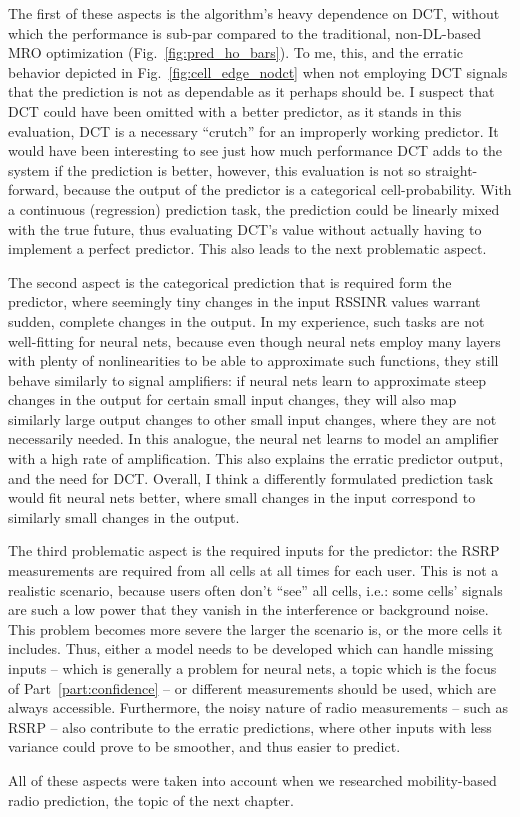 			The first of these aspects is the algorithm's heavy dependence on \ac{DCT}, without which the performance is sub-par compared to the traditional, non-\ac{DL}-based \ac{MRO} optimization (Fig.~\ref{fig:pred_ho_bars}).
			To me, this, and the erratic behavior depicted in Fig.~\ref{fig:cell_edge_nodct} when not employing \ac{DCT} signals that the prediction is not as dependable as it perhaps should be.
			I suspect that \ac{DCT} could have been omitted with a better predictor, as it stands in this evaluation, \ac{DCT} is a necessary ``crutch'' for an improperly working predictor.
			It would have been interesting to see just how much performance \ac{DCT} adds to the system if the prediction is better, however, this evaluation is not so straight-forward, because the output of the predictor is a categorical cell-probability.
			With a continuous (regression) prediction task, the prediction could be linearly mixed with the true future, thus evaluating \ac{DCT}'s value without actually having to implement a perfect predictor.
			This also leads to the next problematic aspect.
			
			The second aspect is the categorical prediction that is required form the predictor, where seemingly tiny changes in the input \ac{RSSINR} values warrant sudden, complete changes in the output.
			In my experience, such tasks are not well-fitting for neural nets, because even though neural nets employ many layers with plenty of nonlinearities to be able to approximate such functions, they still behave similarly to signal amplifiers: if neural nets learn to approximate steep changes in the output for certain small input changes, they will also map similarly large output changes to other small input changes, where they are not necessarily needed.
			In this analogue, the neural net learns to model an amplifier with a high rate of amplification.
			This also explains the erratic predictor output, and the need for \ac{DCT}.
			Overall, I think a differently formulated prediction task would fit neural nets better, where small changes in the input correspond to similarly small changes in the output.
			
			The third problematic aspect is the required inputs for the predictor: the \ac{RSRP} measurements are required from all cells at all times for each user.
			This is not a realistic scenario, because users often don't ``see'' all cells, i.e.: some cells' signals are such a low power that they vanish in the interference or background noise.
			This problem becomes more severe the larger the scenario is, or the more cells it includes.
			Thus, either a model needs to be developed which can handle missing inputs -- which is generally a problem for neural nets, a topic which is the focus of Part~\ref{part:confidence} -- or different measurements should be used, which are always accessible.
			Furthermore, the noisy nature of radio measurements -- such as \ac{RSRP} -- also contribute to the erratic predictions, where other inputs with less variance could prove to be smoother, and thus easier to predict.
			
			All of these aspects were taken into account when we researched mobility-based radio prediction, the topic of the next chapter.
